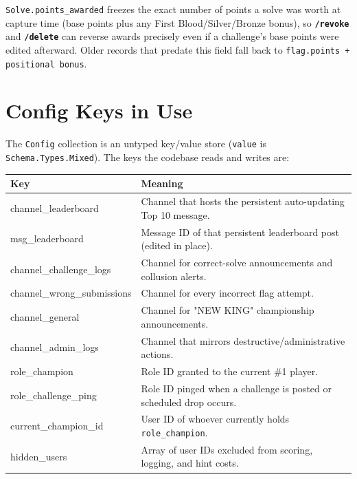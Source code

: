 \documentclass[12pt,a4paper]{report}
\newcommand{\cmd}[1]{\texttt{\color{cybercyan}\textbf{#1}}}
\newcommand{\note}[1]{
    \begin{tcolorbox}[colback=cyberblue!5, colframe=cyberblue,
        title=\textbf{NOTE}, fonttitle=\sffamily\small]
    #1
    \end{tcolorbox}
}
\begin{document}
\note{
\texttt{Solve.points\_awarded} freezes the exact number of points a solve was worth at capture
time (base points plus any First Blood/Silver/Bronze bonus), so \cmd{/revoke} and \cmd{/delete}
can reverse awards precisely even if a challenge's base points were edited afterward. Older records
that predate this field fall back to \texttt{flag.points + positional bonus}.
}

\section{Config Keys in Use}

The \texttt{Config} collection is an untyped key/value store (\texttt{value} is
\texttt{Schema.Types.Mixed}). The keys the codebase reads and writes are:

\begin{center}
\begin{tabular}{>{\ttfamily}l p{8.5cm}}
\toprule
\textbf{Key} & \textbf{Meaning} \\
\midrule
channel\_leaderboard        & Channel that hosts the persistent auto-updating Top 10 message. \\
msg\_leaderboard            & Message ID of that persistent leaderboard post (edited in place). \\
channel\_challenge\_logs    & Channel for correct-solve announcements and collusion alerts. \\
channel\_wrong\_submissions & Channel for every incorrect flag attempt. \\
channel\_general            & Channel for "NEW KING" championship announcements. \\
channel\_admin\_logs        & Channel that mirrors destructive/administrative actions. \\
role\_champion               & Role ID granted to the current \#1 player. \\
role\_challenge\_ping        & Role ID pinged when a challenge is posted or scheduled drop occurs. \\
current\_champion\_id        & User ID of whoever currently holds \texttt{role\_champion}. \\
hidden\_users                & Array of user IDs excluded from scoring, logging, and hint costs. \\
\bottomrule
\end{tabular}
\end{center}

\newpage
\end{document}

